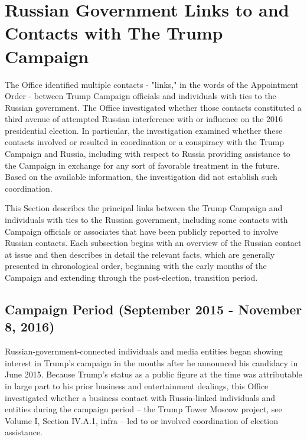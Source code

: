 \section{Russian Government Links to and Contacts with The Trump Campaign}

The Office identified multiple contacts - "links," in the words of the Appointment Order - between Trump Campaign officials and individuals with ties to the Russian government.
The Office investigated whether those contacts constituted a third avenue of attempted Russian interference with or influence on the 2016 presidential election.
In particular, the investigation examined whether these contacts involved or resulted in coordination or a conspiracy with the Trump Campaign and Russia, including with respect to Russia providing assistance to the Campaign in exchange for any sort of favorable treatment in the future.
Based on the available information, the investigation did not establish such coordination.

This Section describes the principal links between the Trump Campaign and individuals with ties to the Russian government, including some contacts with Campaign officials or associates that have been publicly reported to involve Russian contacts.
Each subsection begins with an overview of the Russian contact at issue and then describes in detail the relevant facts, which are generally presented in chronological order, beginning with the early months of the Campaign and extending through the post-election, transition period.

\subsection{Campaign Period (September 2015 - November 8, 2016)}

Russian-government-connected individuals and media entities began showing interest in Trump's campaign in the months after he announced his candidacy in June 2015.
Because Trump's status as a public figure at the time was attributable in large part to his prior business and entertainment dealings, this Office investigated whether a business contact with Russia-linked individuals and entities during the campaign period -- the Trump Tower Moscow project, see Volume I, Section IV.A.1, infra -- led to or involved coordination of election assistance.

